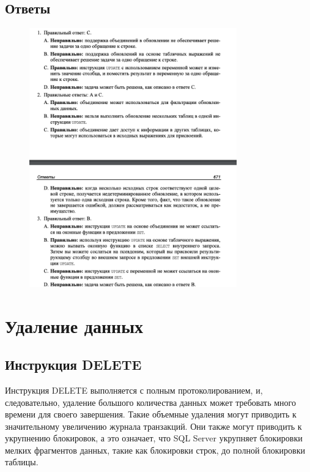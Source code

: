 \subsection*{Ответы}

\begin{figure}[h!]
	\begin{center}
		\includegraphics[width=0.8\textwidth]{img/ans22.png}
	\end{center}
	\captionsetup{justification=centering}
\end{figure}




\section{Удаление данных}

\subsection{Инструкция DELETE}

Инструкция
DELETE выполняется с полным протоколированием, и, следовательно, удаление
большого количества данных может требовать много времени для своего завершения. Такие объемные удаления могут приводить к значительному увеличению журнала транзакций. Они также могут приводить к укрупнению блокировок, а это означает, что SQL Server укрупняет блокировки мелких фрагментов данных, такие
как блокировки строк, до полной блокировки таблицы.

